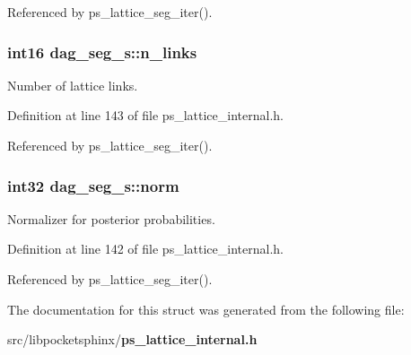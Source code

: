 Referenced by ps\-\_\-lattice\-\_\-seg\-\_\-iter().

\subsubsection[{n\-\_\-links}]{\setlength{\rightskip}{0pt plus 5cm}int16 dag\-\_\-seg\-\_\-s\-::n\-\_\-links}\label{structdag__seg__s_a2a858ea6ef051074be2bd1716a4939fb}


Number of lattice links. 



Definition at line 143 of file ps\-\_\-lattice\-\_\-internal.\-h.



Referenced by ps\-\_\-lattice\-\_\-seg\-\_\-iter().

\subsubsection[{norm}]{\setlength{\rightskip}{0pt plus 5cm}int32 dag\-\_\-seg\-\_\-s\-::norm}\label{structdag__seg__s_a4517656eeaa40d33109d39a251a75dea}


Normalizer for posterior probabilities. 



Definition at line 142 of file ps\-\_\-lattice\-\_\-internal.\-h.



Referenced by ps\-\_\-lattice\-\_\-seg\-\_\-iter().



The documentation for this struct was generated from the following file\-:\begin{DoxyCompactItemize}
\item 
src/libpocketsphinx/{\bf ps\-\_\-lattice\-\_\-internal.\-h}\end{DoxyCompactItemize}
